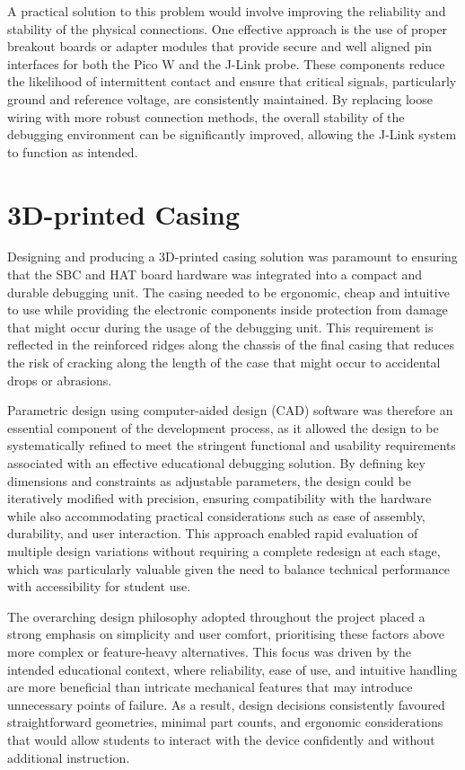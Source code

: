 A practical solution to this problem would involve improving the reliability and stability of the physical connections. One effective approach is the use of proper breakout boards or adapter modules that provide secure and well aligned pin interfaces for both the Pico W and the J-Link probe. These components reduce the likelihood of intermittent contact and ensure that critical signals, particularly ground and reference voltage, are consistently maintained. By replacing loose wiring with more robust connection methods, the overall stability of the debugging environment can be significantly improved, allowing the J-Link system to function as intended.

\section{3D-printed Casing}
Designing and producing a 3D-printed casing solution was paramount to ensuring that the SBC and HAT board hardware was integrated into a compact and durable debugging unit. The casing needed to be ergonomic, cheap and intuitive to use while providing the electronic components inside protection from damage that might occur during the usage of the  debugging unit. This requirement is reflected in the reinforced ridges along the chassis of the final casing that reduces the risk of cracking along the length of the case that might occur to accidental drops or abrasions.

Parametric design using computer-aided design (CAD) software was therefore an essential component of the development process, as it allowed the design to be systematically refined to meet the stringent functional and usability requirements associated with an effective educational debugging solution. By defining key dimensions and constraints as adjustable parameters, the design could be iteratively modified with precision, ensuring compatibility with the hardware while also accommodating practical considerations such as ease of assembly, durability, and user interaction. This approach enabled rapid evaluation of multiple design variations without requiring a complete redesign at each stage, which was particularly valuable given the need to balance technical performance with accessibility for student use.

The overarching design philosophy adopted throughout the project placed a strong emphasis on simplicity and user comfort, prioritising these factors above more complex or feature-heavy alternatives. This focus was driven by the intended educational context, where reliability, ease of use, and intuitive handling are more beneficial than intricate mechanical features that may introduce unnecessary points of failure. As a result, design decisions consistently favoured straightforward geometries, minimal part counts, and ergonomic considerations that would allow students to interact with the device confidently and without additional instruction.

